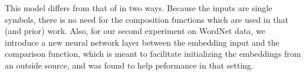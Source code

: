 This model differs from that of \citet{bowman2013can} in two ways. Because 
the inputs are single symbols, there is no need for the composition functions
which are used in that (and prior) work. Also, for our second experiment on 
WordNet data, we introduce a new neural network layer between the embedding input
and the comparison function, which is meant to facilitate initializing the embeddings
from an outside source, and was found to help peformance in that setting.


